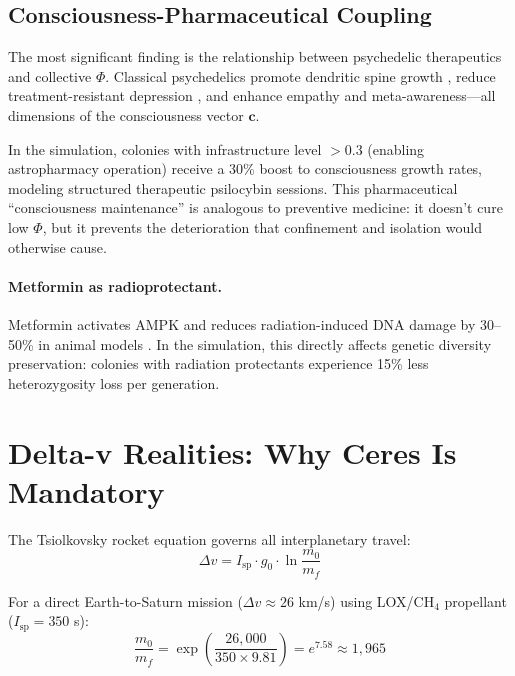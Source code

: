 \documentclass[12pt,a4paper]{article}
\begin{document}
\subsection{Consciousness-Pharmaceutical Coupling}

The most significant finding is the relationship between psychedelic therapeutics and collective $\Phi$. Classical psychedelics promote dendritic spine growth \citep{shao2021psilocybin}, reduce treatment-resistant depression \citep{carhart2021trial}, and enhance empathy and meta-awareness---all dimensions of the consciousness vector $\mathbf{c}$.

In the simulation, colonies with infrastructure level $> 0.3$ (enabling astropharmacy operation) receive a 30\% boost to consciousness growth rates, modeling structured therapeutic psilocybin sessions. This pharmaceutical ``consciousness maintenance'' is analogous to preventive medicine: it doesn't cure low $\Phi$, but it prevents the deterioration that confinement and isolation would otherwise cause.

\paragraph{Metformin as radioprotectant.} Metformin activates AMPK and reduces radiation-induced DNA damage by 30--50\% in animal models \citep{steinberg2009ampk}. In the simulation, this directly affects genetic diversity preservation: colonies with radiation protectants experience 15\% less heterozygosity loss per generation.


\section{Delta-v Realities: Why Ceres Is Mandatory}
\label{sec:deltav}

The Tsiolkovsky rocket equation governs all interplanetary travel:
\begin{equation}
    \Delta v = I_\text{sp} \cdot g_0 \cdot \ln\frac{m_0}{m_f}
\end{equation}

For a direct Earth-to-Saturn mission ($\Delta v \approx 26$ km/s) using LOX/CH$_4$ propellant ($I_\text{sp} = 350$ s):
\begin{equation}
    \frac{m_0}{m_f} = \exp\left(\frac{26{,}000}{350 \times 9.81}\right) = e^{7.58} \approx 1{,}965
\end{equation}
\end{document}
